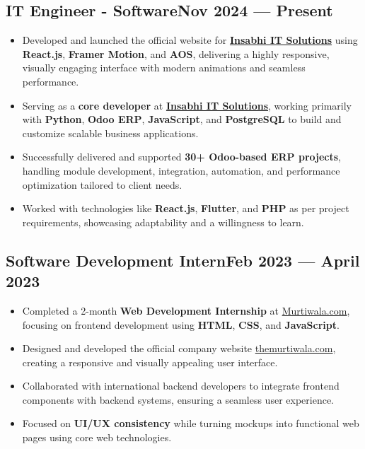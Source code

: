 \subsection{{IT Engineer - Software\hfill Nov 2024 --- Present}}

\vspace{0.1em}
{\color{black}
\begin{itemize}\itemsep 0.1em
  \item Developed and launched the official website for \textbf{\href{https://www.insabhi.com}{Insabhi IT Solutions}} using \textbf{React.js}, \textbf{Framer Motion}, and \textbf{AOS}, delivering a highly responsive, visually engaging interface with modern animations and seamless performance.
  \item Serving as a \textbf{core developer} at \textbf{\href{https://www.insabhi.com}{Insabhi IT Solutions}}, working primarily with \textbf{Python}, \textbf{Odoo ERP}, \textbf{JavaScript}, and \textbf{PostgreSQL} to build and customize scalable business applications.
  \item Successfully delivered and supported \textbf{30+ Odoo-based ERP projects}, handling module development, integration, automation, and performance optimization tailored to client needs.
  \item Worked with technologies like \textbf{React.js}, \textbf{Flutter}, and \textbf{PHP} as per project requirements, showcasing adaptability and a willingness to learn.
\end{itemize}
}

\vspace{0.3em}

\subsection{{Software Development Intern\hfill Feb 2023 — April 2023}}

\vspace{0.1em}
{\color{black}
\begin{itemize}\itemsep 0.1em
  \item Completed a 2-month \textbf{Web Development Internship} at \href{https://themurtiwala.com}{Murtiwala.com}, focusing on frontend development using \textbf{HTML}, \textbf{CSS}, and \textbf{JavaScript}.
  \item Designed and developed the official company website \href{https://themurtiwala.com}{themurtiwala.com}, creating a responsive and visually appealing user interface.
  \item Collaborated with international backend developers to integrate frontend components with backend systems, ensuring a seamless user experience.
  \item Focused on \textbf{UI/UX consistency} while turning mockups into functional web pages using core web technologies.
\end{itemize}
}
